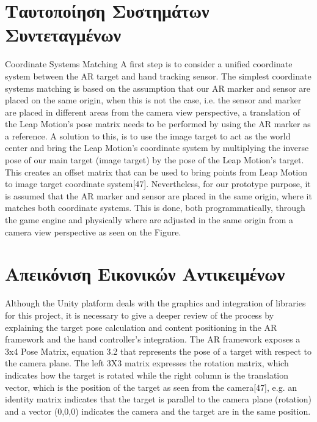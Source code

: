 \section{Tαυτοποίηση Συστημάτων Συντεταγμένων}

Coordinate Systems Matching A first step is to consider a unified coordinate system between the AR target and hand tracking sensor. The simplest coordinate systems matching is based on the assumption that our AR marker and sensor are placed on the same origin, when this is not the case, i.e. the sensor and marker are placed in different areas from the camera view perspective, a translation of the Leap Motion’s pose matrix needs to be performed by using the AR marker as a reference. A solution to this, is to use the image target to act as the world center and bring the Leap Motion’s coordinate system by multiplying the inverse pose of our main target (image target) by the pose of the Leap Motion’s target. This creates an offset matrix that can be used to bring points from Leap Motion to image target coordinate system[47]. Nevertheless, for our prototype purpose, it is assumed that the AR marker and sensor are placed in the same origin, where it matches both coordinate systems. This is done, both programmatically, through the game engine and physically where are adjusted in the same origin from a camera view perspective as seen on the Figure.


\section{Απεικόνιση Εικονικών Αντικειμένων} \label{s:rendering}
Although the Unity platform deals with the graphics and integration of libraries for this project, it is necessary to give a deeper review of the process by explaining the target pose calculation and content positioning in the AR framework and the hand controller’s integration. The AR framework exposes a 3x4 Pose Matrix, equation 3.2 that represents the pose of a target with respect to the camera plane. The left 3X3 matrix expresses the rotation matrix, which indicates how the target is rotated while the right column is the translation vector, which is the position of the target as seen from the camera[47], e.g. an identity matrix indicates that the target is parallel to the camera plane (rotation) and a vector (0,0,0) indicates the camera and the target are in the same position.

